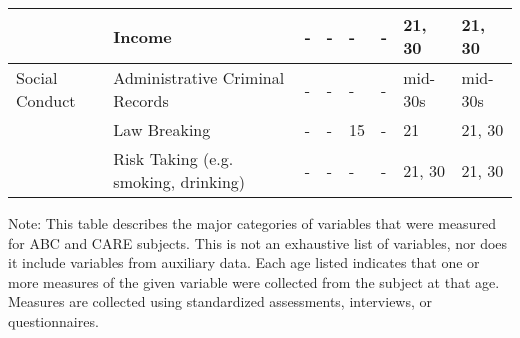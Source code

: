 \begin{sidewaystable}
{\begin{tabular*}{\textwidth}{L{2cm} C{3.5cm} C{2.8cm} C{2.8cm} C{2.5cm}  C{2.5cm} C{2cm} C{2cm}}
 & Income & - & - & - & - & 21, 30 & 21, 30 \\
 \midrule
Social Conduct & Administrative Criminal Records & - & - & - & - & mid-30s & mid-30s \\
& Law Breaking & - & - & 15 & - & 21 & 21, 30 \\
 & Risk Taking (e.g. smoking, drinking) & - & - & - & - & 21, 30 & 21, 30 \\
\toprule
\end{tabular*}}
\begin{tablenotes}
\item Note: This table describes the major categories of variables that were measured for ABC and CARE subjects. This is not an exhaustive list of variables, nor does it include variables from auxiliary data. Each age listed indicates that one or more measures of the given variable were collected from the subject at that age. Measures are collected using standardized assessments, interviews, or questionnaires. 
\end{tablenotes}
\end{sidewaystable}